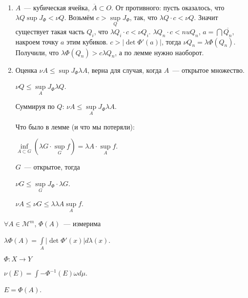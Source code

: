 \documentclass{article}
\begin{document}
            \begin{enumerate}
            
                \item $A$~--- кубическая ячейка, $\overline{A} \subset O$. От противного: пусть оказалось, что $\lambda Q \sup J_{\Phi} < \nu Q$. Возьмём $c > \sup\limits_{Q} J_{\Phi}$, так, что $\lambda Q \cdot c < \nu Q$. Значит существует такая часть $Q_i$, что $\lambda Q_i \cdot c < \nu Q_i$. $\lambda Q_n \cdot c < nu Q_n$, $a = \bigcap \overline{Q_n}$, накроем точку $a$ этим кубиков. $c > \left| \det \Phi'(a) \right|$, тогда $\nu Q_n = \lambda \Phi(Q_n)$. Получили, что $\lambda \Phi(Q_n) > c \lambda Q_n$, а по лемме нужно наоборот.
            
                \item Оценка $\nu A \leqslant \sup J_{\Phi} \lambda A$, верна для случая, когда $A$~--- открытое множество.
                
                    $\nu Q \leqslant \sup\limits_{A} J_{\Phi} \lambda Q$.
                    
                    Суммируя по $Q$: $\nu A \leqslant \sup\limits_{A} J_{\Phi} \lambda A$.
                    
                    Что было в лемме (и что мы потеряли):
                    
                    $\inf\limits_{A \subset G} \left( \lambda G \cdot \sup\limits_{G} f \right) = \lambda A \cdot \sup\limits_{A} f$.
                    
                    $G$~--- открытое, тогда
                    
                    $\nu G \leqslant \sup\limits_{G} J_{\Phi} \cdot \lambda G$.
                    
                    $\nu A \leqslant \nu G \leqslant \lambda \lambda A \sup\limits_{A} f$.
                    
            \end{enumerate}

    \newpage
    
    $\forall A \in \mathcal{M}^m$, $\Phi(A)$~--- измерима
    
    $\lambda \Phi(A) = \int\limits_A \left| \det \Phi'(x) \right| d \lambda (x)$.
    
    $\Phi: X \rightarrow Y$
    
    $\nu(E) = \int\limits-{\Phi^{-1}(E)} \omega d \mu$.
    
    $E = \Phi(A)$.
    
\end{document}
